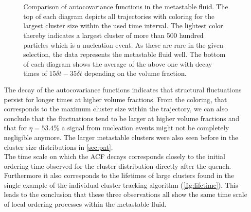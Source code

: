 \begin{figure}[h]
\begin{center}
 \hspace{0.5cm}
 \\
 \hspace{0.5cm}
 \\
\caption[Autocovariance functions of largest cluster in the metastable fluid]{Comparison of autocovariance functions in the metastable fluid. The top of each diagram depicts all trajectories with coloring for the largest cluster size within the used time interval. The lightest color thereby indicates a largest cluster of more than 500 hundred particles which is a nucleation event. As these are rare in the given selection, the data represents the metastable fluid well. The bottom of each diagram shows the average of the above one with decay times of $ 15 \delta t- 35 \delta t$ depending on the volume fraction. }
\label{fig:acf}
\end{center}
\end{figure}

The decay of the autocovariance functions indicates that structural fluctuations persist for longer times at higher volume fractions. From the coloring, that corresponds to the maximum cluster size within the trajectory, we can also conclude that the fluctuations tend to be larger at higher volume fractions and that for $\eta=53.4\%$ a signal from nucleation events might not be completely negligible anymore. The larger metastable clusters were also seen before in the cluster size distributions in \autoref{sec:pnt}.\\
The time scale on which the ACF decays corresponds closely to the initial ordering time observed for the cluster distribution directly after the quench. Furthermore it also corresponds to the lifetimes of large clusters found in the single example of the individual cluster tracking algorithm (\autoref{fig:lifetime}). This leads to the conclusion that these three observations all show the same time scale of local ordering processes within the metastable fluid. 

